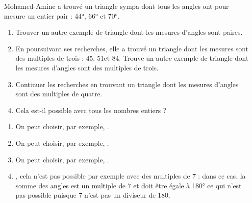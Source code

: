 \begin{Maquette}[Fiche,CorrigeFin,Colonnes=2]{}
\begin{multicols}{2}
      
      \begin{exercice} %
         Mohamed-Amine a trouvé un triangle sympa dont tous les angles ont pour mesure un entier pair : \ang{44}, \ang{66} et \ang{70}.
         \begin{enumerate}
            \item Trouver un autre exemple de triangle dont les mesures d'angles sont paires.
            \item En poursuivant ses recherches, elle a trouvé un triangle dont les mesures sont des multiples de trois : 45\degre, 51\degre et 84\degre. Trouve un autre exemple de triangle dont les mesures d'angles sont des multiples de trois.
            \item Continuer les recherches en trouvant un triangle dont les mesures d'angles sont des multiples de quatre.
            \item Cela est-il possible avec tous les nombres entiers ?
         \end{enumerate}
      \end{exercice}
      
      \begin{Solution}
         \begin{enumerate}
            \item On peut choisir, par exemple, .
            \item On peut choisir, par exemple, .
            \item On peut choisir, par exemple, .
            \item {}, cela n'est pas possible par exemple avec des multiples de 7 : dans ce cas, la somme des angles est un multiple de 7 et doit être égale à \ang{180} ce qui n'est pas possible puisque 7 n'est pas un diviseur de 180.
         \end{enumerate}
      \end{Solution}
      

\end{multicols}
\end{Maquette}
